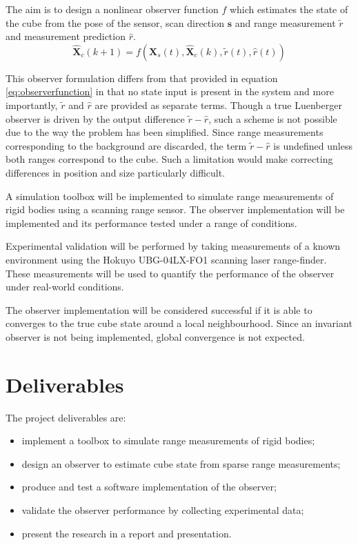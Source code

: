 The aim is to design a nonlinear observer function $f$ which estimates the state of the cube from the pose of the sensor, scan direction $\mathbf{s}$ and range measurement $\tilde{r}$ and measurement prediction $\hat{r}$.
\begin{equation}
	\hat{\mathbf{X}}_{c}(k+1) = f(\mathbf{X}_{s}(t),\hat{\mathbf{X}}_{c}(k),\tilde{r}(t),\hat{r}(t))
\end{equation}

This observer formulation differs from that provided in equation \ref{eq:observerfunction} in that no state input is present in the system and more importantly, $\tilde{r}$ and $\hat{r}$ are provided as separate terms. Though a true Luenberger observer is driven by the output difference $\tilde{r} - \hat{r}$, such a scheme is not possible due to the way the problem has been simplified. Since range measurements corresponding to the background are discarded, the term $\tilde{r} - \hat{r}$ is undefined unless both ranges correspond to the cube. Such a limitation would make correcting differences in position and size particularly difficult.

A simulation toolbox will be implemented to simulate range measurements of rigid bodies using a scanning range sensor. The observer implementation will be implemented and its performance tested under a range of conditions. 

Experimental validation will be performed by taking measurements of a known environment using the Hokuyo UBG-04LX-FO1 scanning laser range-finder. These measurements will be used to quantify the performance of the observer under real-world conditions.

The observer implementation will be considered successful if it is able to converges to the true cube state around a local neighbourhood. Since an invariant observer is not being implemented, global convergence is not expected.

\section{Deliverables}
The project deliverables are:
\begin{itemize}
\item implement a toolbox to simulate range measurements of rigid bodies;
\item design an observer to estimate cube state from sparse range measurements;
\item produce and test a software implementation of the observer;
\item validate the observer performance by collecting experimental data;
\item present the research in a report and presentation.
\end{itemize}
